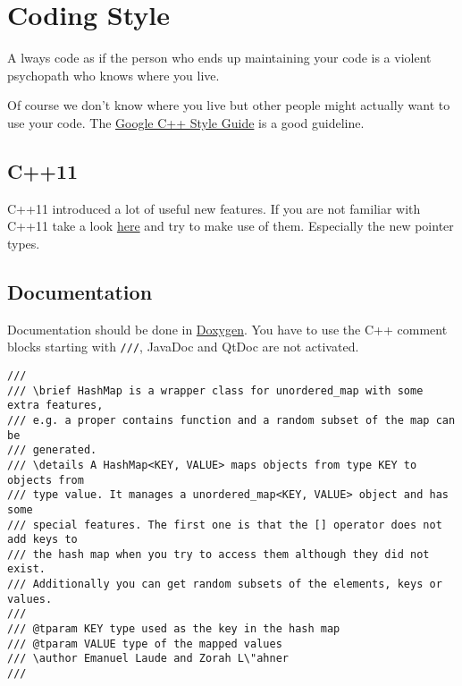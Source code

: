 
\chapter{Coding Style}
\label{chapter:CodingStyle}

\begin{mdframed}
\lettrine{A}{} lways code as if the person who ends up maintaining your code is a violent psychopath who knows where you live.
\end{mdframed}

Of course we don't know where you live but other people might actually want to use your code. The \href{http://google-styleguide.googlecode.com/svn/trunk/cppguide.html}{Google C++ Style Guide} is a good guideline. 

\section{C++11}
\label{sec:Cpp11}

C++11 introduced a lot of useful new features. If you are not familiar with C++11 take a look \href{http://www.codeproject.com/Articles/570638/Ten-Cplusplus-Features-Every-Cplusplus-Developer}{here} and try to make use of them. Especially the new pointer types. 

\section{Documentation}
\label{sec:Documentation}

Documentation should be done in \href{http://www.stack.nl/~dimitri/doxygen/}{Doxygen}. You have to use the C++ comment blocks starting with \texttt{///}, JavaDoc and QtDoc are not activated. 

\begin{lstlisting}
///
/// \brief HashMap is a wrapper class for unordered_map with some extra features,
/// e.g. a proper contains function and a random subset of the map can be 
/// generated.
/// \details A HashMap<KEY, VALUE> maps objects from type KEY to objects from 
/// type value. It manages a unordered_map<KEY, VALUE> object and has some 
/// special features. The first one is that the [] operator does not add keys to 
/// the hash map when you try to access them although they did not exist. 
/// Additionally you can get random subsets of the elements, keys or values.
///
/// @tparam KEY type used as the key in the hash map
/// @tparam VALUE type of the mapped values
/// \author Emanuel Laude and Zorah L\"ahner
///
\end{lstlisting}


